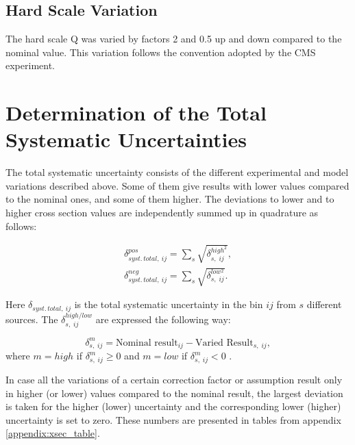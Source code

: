 \subsection{Hard Scale Variation}\label{ssec:hardS_sys}

The hard scale Q was varied by factors
2 and 0.5 up and down compared to the nominal value. This variation follows the convention 
adopted by the CMS experiment.

\section{Determination of the Total Systematic Uncertainties}\label{sec:syst_det}

The total systematic uncertainty consists of the different experimental and model variations described above.
Some of them give results with lower values compared to the nominal ones, and some of them higher.
The deviations to lower and to higher cross section values are independently summed up in quadrature as follows:

\begin{align}
 \delta_{syst.\,total,\:ij}^{pos} = \sum_{s}\sqrt{\delta_{s,\;ij}^{high^{2}}}, \\
 \delta_{syst.\,total,\:ij}^{neg} = \sum_{s} \sqrt{\delta_{s,\;ij}^{low^{2}}}.
\end{align}

Here $\delta_{syst.\,total,\:ij}$ is the total systematic uncertainty in the bin $ij$ from
$s$ different sources. The $\delta_{s,\;ij}^{high/low}$ are expressed the following way:

\begin{equation}
 \delta_{s,\;ij}^{m} = \textrm{Nominal result}_{ij} - \textrm{Varied Result}_{s,\;ij}, 
\end{equation}
where $m = high$ if $\delta_{s,\;ij}^{m} \geq 0$ and $m = low$ if $\delta_{s,\;ij}^{m} < 0$ . 

In case all the variations of a certain correction factor or assumption result only in higher (or lower) values 
compared to the nominal result, the largest deviation is taken for the higher (lower) uncertainty and the corresponding 
lower (higher) uncertainty is set to zero. These numbers are presented
in tables from appendix \ref{appendix:xsec_table}.

% 

